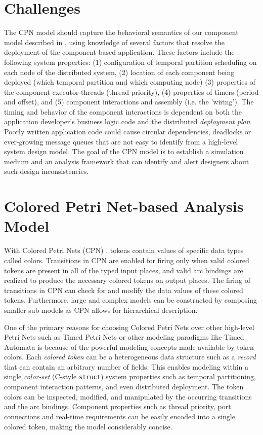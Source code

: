 \section{Challenges}

The CPN model should capture the behavioral semantics of our component model
described in \cite{ISIS_F6_ISORC:13}, using knowledge of several factors that resolve the deployment of the component-based application. These factors include the following system properties: (1) configuration of temporal partition scheduling on each node of the distributed system, (2) location of each component being deployed (which temporal partition and which computing node) (3) properties of the component executor threads (thread priority), (4) properties of timers (period and offset),
and (5) component interactions and assembly (i.e. the 'wiring'). The timing and behavior of the component interactions is dependent on both the application developer's business logic code and the distributed \emph{deployment plan}. Poorly written application code could cause circular dependencies, deadlocks or ever-growing message queues that are not easy to identify from a high-level system design model. The goal of the CPN model is to establish a simulation medium and an analysis framework that can identify and alert designers about such design inconsistencies. 

\section{Colored Petri Net-based Analysis Model}

With Colored Petri Nets (CPN) \cite{CPN}, tokens contain values of specific data types called colors. Transitions in CPN are enabled for firing only when valid colored tokens are present in all of the typed input places, and valid arc bindings are realized to produce the necessary colored tokens on output places. The firing of transitions in CPN can check for and modify the data values of these colored tokens. Furthermore, large and complex models can be constructed by composing smaller sub-models as CPN allows for hierarchical description.

One of the primary reasons for choosing Colored Petri Nets over other high-level Petri Nets such as Timed Petri Nets or other modeling paradigms like Timed Automata is because of the powerful modeling concepts made available by token colors. Each \emph{colored token} can be a heterogeneous data structure such as a \emph{record} that can contain an arbitrary number of fields. This enables modeling within a single \emph{color-set} (C-style \texttt{struct}) system properties such as temporal partitioning, component interaction patterns, and even distributed deployment. The token colors can be inspected, modified, and manipulated by the occurring transitions and the arc bindings. Component properties such as thread priority, port connections and real-time requirements can be easily encoded into a single colored token, making the model considerably concise. 


